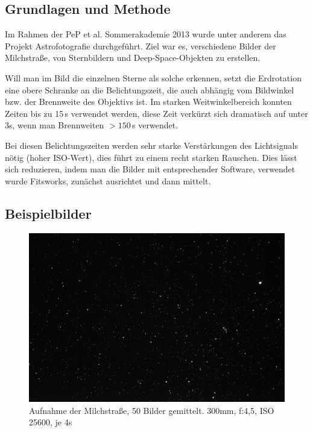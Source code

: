 \subsection{Grundlagen und Methode}
Im Rahmen der PeP et al. Sommerakademie 2013 wurde unter anderem das Projekt Astrofotografie durchgeführt. Ziel war es, verschiedene Bilder der Milchstraße, von Sternbildern und Deep-Space-Objekten zu erstellen.

Will man im Bild die einzelnen Sterne als solche erkennen, setzt die Erdrotation eine obere Schranke an die Belichtungszeit, die auch abhängig vom Bildwinkel bzw. der Brennweite des Objektivs ist. Im starken Weitwinkelbereich konnten Zeiten bis zu 15\,s verwendet werden, diese Zeit verkürzt sich dramatisch auf unter 3s, wenn man Brennweiten $>150$\,s verwendet.

Bei diesen Belichtungszeiten werden sehr starke Verstärkungen des Lichtsignals nötig (hoher ISO-Wert), dies führt zu einem recht starken Rauschen. Dies lässt sich reduzieren, indem man die Bilder mit entsprechender Software, verwendet wurde Fitsworks, zunächst ausrichtet und dann mittelt.

\subsection{Beispielbilder}

\begin{figure}[!h]
\centering
\includegraphics[width=\textwidth]{figs/astro/Haufen.jpg}
\caption{Aufnahme der Milchstraße, 50 Bilder gemittelt. 300mm, f:4,5, ISO 25600,  je 4s}
\end{figure}


